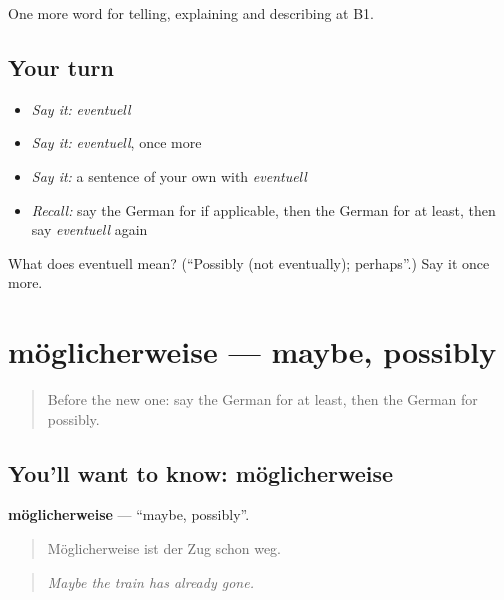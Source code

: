 \begin{grammarlens}[title={What you've built}]
One more word for telling, explaining and describing at B1.
\end{grammarlens}

\subsection*{Your turn}
\begin{itemize}
\raggedright
  \item \emph{Say it:} \emph{eventuell}
  \item \emph{Say it:} \emph{eventuell}, once more
  \item \emph{Say it:} a sentence of your own with \emph{eventuell}
  \item \emph{Recall:} say the German for if applicable, then the German for at least, then say \emph{eventuell} again
\end{itemize}

\begin{tcolorbox}[breakable,colback=teal!4,colframe=teal!35!black,title={Before you move on}]
What does eventuell mean? (\textquotedblleft{}Possibly (not eventually); perhaps\textquotedblright{}.) Say it once more.
\end{tcolorbox}
\section[möglicherweise]{möglicherweise — maybe, possibly}

\label{lesson:GE-C367-moeglicherweise}



\begin{quote}
Before the new one: say the German for at least, then the German for possibly.
\end{quote}

\subsection*{You'll want to know: möglicherweise}
\textbf{möglicherweise} — \textquotedblleft{}maybe, possibly\textquotedblright{}.

\begin{quote}
Möglicherweise ist der Zug schon weg.
\end{quote}

\begin{quote}
\emph{Maybe the train has already gone.}
\end{quote}

